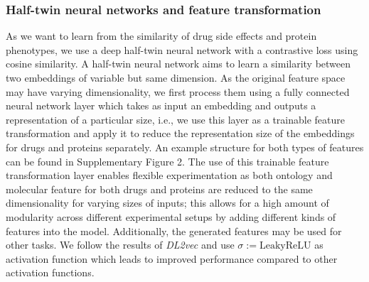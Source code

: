 \documentclass{bioinfo}
\renewcommand{\cite}{\citep}
\begin{document}



\subsubsection{Half-twin neural networks and feature transformation}

As we want to learn from the similarity of drug side effects and
protein phenotypes, we use a deep half-twin neural network with a
contrastive loss using cosine similarity.  A half-twin neural network
aims to learn a similarity between two embeddings of variable but same
dimension. As the original feature space may have varying dimensionality, we first process them using a fully connected
neural network layer which takes as input an embedding and outputs a
representation of a particular size, i.e., we use this layer as a
trainable feature transformation and apply it to reduce the
representation size of the embeddings for drugs and proteins
separately.  An example structure for both types of features can be
found in Supplementary Figure 2.
The use of this trainable feature transformation layer enables
flexible experimentation as both ontology and molecular feature for
both drugs and proteins are reduced to the same dimensionality for
varying sizes of inputs; this allows for a high amount of modularity
across different experimental setups by adding different kinds of
features into the model. Additionally, the generated features may be
used for other tasks. %
We follow the results of \textit{DL2vec} \cite{DL2vec2020} and use $\sigma := \mathrm{LeakyReLU}$ as
activation function  which leads to
improved performance compared to other activation functions.

\end{document}
